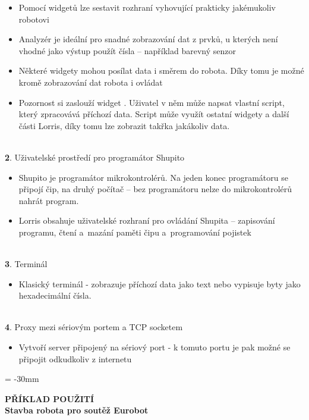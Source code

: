 \documentclass[17pt]{extreport}
\newcommand{\B}{\textbf} %
\begin{document}
\begin{itemize} 
    \item Pomocí widgetů lze sestavit rozhraní vyhovující prakticky jakémukoliv robotovi
    \item Analyzér je ideální pro snadné zobrazování dat z prvků, u kterých není vhodné jako výstup použít čísla -- například barevný senzor
    \item Některé widgety mohou posílat data i směrem do robota. Díky tomu je možné kromě zobrazování dat robota i ovládat
    \item Pozornost si zaslouží widget . Uživatel v něm může napsat vlastní script, který zpracovává příchozí data. Script může využít ostatní widgety a další části Lorris, díky tomu lze zobrazit takřka jakákoliv data.
\end{itemize}
\\{\large \B 2. Uživatelské prostředí pro programátor Shupito }
\begin{itemize}
    \item Shupito je programátor mikrokontrolérů. Na jeden konec programátoru se připojí čip, na druhý počítač -- bez programátoru nelze do mikrokontrolérů nahrát program.
    \item Lorris obsahuje uživatelské rozhraní pro ovládání Shupita -- zapisování programu, čtení a~mazání paměti čipu a~programování pojistek
\end{itemize}
\\{\large \B 3. Terminál }
\begin{itemize}
    \item Klasický terminál - zobrazuje příchozí data jako text nebo vypisuje byty jako hexadecimální čísla.
\end{itemize}
\\{\large \B 4. Proxy mezi sériovým portem a TCP socketem }
\begin{itemize}
    \item Vytvoří server připojený na sériový port - k tomuto portu je pak možné se připojit odkudkoliv z internetu
\end{itemize}

\newpage
\voffset = -30mm %
\begin{center}
    \Large \B{PŘÍKLAD POUŽITÍ \\ Stavba robota pro soutěž Eurobot}
\end{center}
\vspace{5mm}
\enlargethispage{60mm} %
\end{document}
